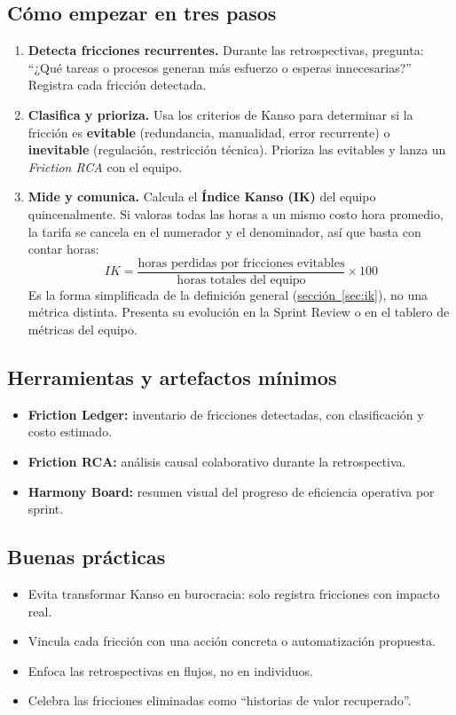 \subsection*{Cómo empezar en tres pasos}
\begin{enumerate}
    \item \textbf{Detecta fricciones recurrentes.}  
    Durante las retrospectivas, pregunta: ``¿Qué tareas o procesos generan más esfuerzo o esperas innecesarias?''  
    Registra cada fricción detectada.
    
    \item \textbf{Clasifica y prioriza.}  
    Usa los criterios de Kanso para determinar si la fricción es \textbf{evitable} (redundancia, manualidad, error recurrente) o \textbf{inevitable} (regulación, restricción técnica).  
    Prioriza las evitables y lanza un \textit{Friction RCA} con el equipo.
    
    \item \textbf{Mide y comunica.}  
    Calcula el \textbf{Índice Kanso (IK)} del equipo quincenalmente. Si valoras todas las horas
    a un mismo costo hora promedio, la tarifa se cancela en el numerador y el denominador, así que
    basta con contar horas:
    \[
    IK = \frac{\text{horas perdidas por fricciones evitables}}{\text{horas totales del equipo}} \times 100
    \]  
    Es la forma simplificada de la definición general (\hyperref[sec:ik]{sección~\ref{sec:ik}}), no una
    métrica distinta. Presenta su evolución en la Sprint Review o en el tablero de métricas del equipo.
\end{enumerate}

\subsection*{Herramientas y artefactos mínimos}
\begin{itemize}
    \item \textbf{Friction Ledger:} inventario de fricciones detectadas, con clasificación y costo estimado.
    \item \textbf{Friction RCA:} análisis causal colaborativo durante la retrospectiva.
    \item \textbf{Harmony Board:} resumen visual del progreso de eficiencia operativa por sprint.
\end{itemize}

\subsection*{Buenas prácticas}
\begin{itemize}
    \item Evita transformar Kanso en burocracia: solo registra fricciones con impacto real.
    \item Vincula cada fricción con una acción concreta o automatización propuesta.
    \item Enfoca las retrospectivas en flujos, no en individuos.
    \item Celebra las fricciones eliminadas como ``historias de valor recuperado''.
\end{itemize}

